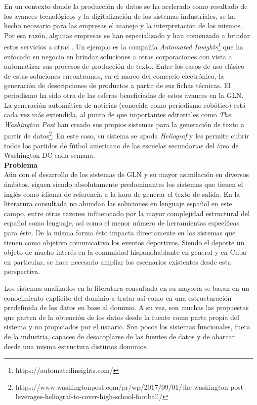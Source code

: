     En un contexto donde la producción de datos se ha acelerado como resultado de los avances tecnológicos y la digitalización de los sistemas industriales, se ha hecho necesario para 
las empresas el manejo y la interpretación de los mismos. Por esa raz\'on, algunas empresas se han especializado y han comenzado a brindar estos servicios a otras . 
Un ejemplo es la compañía \textit{Automated Insights\footnote[1]{https://automatedinsights.com/}} que ha enfocado su negocio en brindar soluciones a otras corporaciones con vista a automatizar sus 
procesos de producción de texto. Entre los casos de uso clásico de estas soluciones encontramos, en el marco del comercio electr\'onico, la generación de descripciones de 
productos a partir de sus fichas técnicas. El periodismo ha sido otra de las esferas beneficiadas de estos avances en la GLN. La generación automática de noticias (conocida como 
periodismo robótico) está cada vez más extendida, al punto de que importantes editoriales como \textit{The Washington Post} han creado sus propios sistemas para la generación de 
texto a partir de datos\footnote[2]{https://www.washingtonpost.com/pr/wp/2017/09/01/the-washington-post-leverages-heliograf-to-cover-high-school-football/}. 
En este caso, su sistema se apoda \textit{Heliograf} y les permite cubrir todos los partidos de fútbol americano de las escuelas secundarias del área de Washington DC 
cada semana.\\

       \textbf{Problema}\\

    Aún con el desarrollo de los sistemas de GLN y su mayor asimilación en diversos ámbitos, siguen siendo absolutamente predominantes los 
sistemas que tienen el inglés como idioma de referencia a la hora de generar el texto de salida. En la literatura consultada no abundan las soluciones 
en lenguaje español en este campo, entre otras razones influenciado por la mayor complejidad estructural del español como lenguaje, así como el menor número 
de herramientas específicas para éste. De la misma forma ésto impacta directamente en los sistemas que tienen como objetivo comunicativo los eventos deportivos. Siendo el deporte un objeto de mucho interés en la 
comunidad hispanohablante en general y en Cuba en particular, se hace necesario ampliar los escenarios existentes desde esta perspectiva.

    Los sistemas analizados en la literatura consultada en su mayoría se basan en un conocimiento explícito del dominio a tratar así como en una 
estructuración predefinida de los datos en base al dominio. A su vez, son muchas las propuestas que parten de la obtención de los datos desde 
la fuente como parte propia del sistema y no propiciados por el usuario. Son pocos los sistemas funcionales, fuera de la industria, capaces de 
desacoplarse de las fuentes de datos y de abarcar desde una misma estructura distintos dominios.\\

